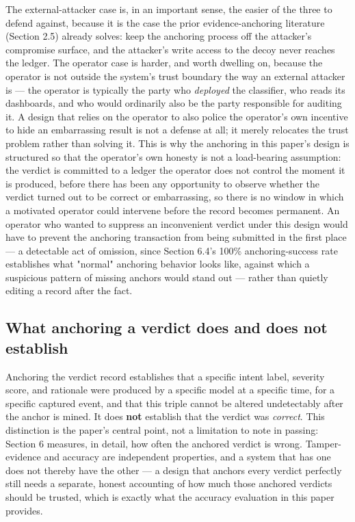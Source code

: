 \documentclass[journal,10pt,twocolumn]{IEEEtran}
\begin{document}
The external-attacker case is, in an important sense, the easier of the three to defend against, because it is the case the prior evidence-anchoring literature (Section 2.5) already solves: keep the anchoring process off the attacker's compromise surface, and the attacker's write access to the decoy never reaches the ledger. The operator case is harder, and worth dwelling on, because the operator is not outside the system's trust boundary the way an external attacker is --- the operator is typically the party who \emph{deployed} the classifier, who reads its dashboards, and who would ordinarily also be the party responsible for auditing it. A design that relies on the operator to also police the operator's own incentive to hide an embarrassing result is not a defense at all; it merely relocates the trust problem rather than solving it. This is why the anchoring in this paper's design is structured so that the operator's own honesty is not a load-bearing assumption: the verdict is committed to a ledger the operator does not control the moment it is produced, before there has been any opportunity to observe whether the verdict turned out to be correct or embarrassing, so there is no window in which a motivated operator could intervene before the record becomes permanent. An operator who wanted to suppress an inconvenient verdict under this design would have to prevent the anchoring transaction from being submitted in the first place --- a detectable act of omission, since Section 6.4's 100\% anchoring-success rate establishes what "normal" anchoring behavior looks like, against which a suspicious pattern of missing anchors would stand out --- rather than quietly editing a record after the fact.

\subsection{What anchoring a verdict does and does not establish}

Anchoring the verdict record establishes that a specific intent label, severity score, and rationale were produced by a specific model at a specific time, for a specific captured event, and that this triple cannot be altered undetectably after the anchor is mined. It does \textbf{not} establish that the verdict was \emph{correct}. This distinction is the paper's central point, not a limitation to note in passing: Section 6 measures, in detail, how often the anchored verdict is wrong. Tamper-evidence and accuracy are independent properties, and a system that has one does not thereby have the other --- a design that anchors every verdict perfectly still needs a separate, honest accounting of how much those anchored verdicts should be trusted, which is exactly what the accuracy evaluation in this paper provides.
\end{document}
